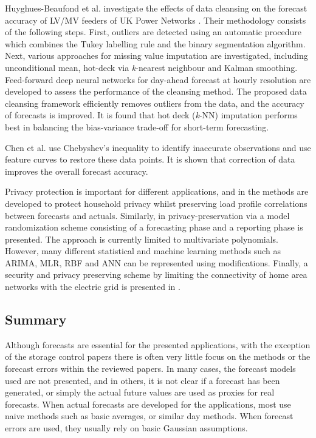 Huyghues-Beaufond et al. investigate the effects of data cleansing on the forecast accuracy of LV/MV feeders of UK Power Networks \cite{huyghues-beaufond2020raa}. Their methodology consists of the following steps. First, outliers are detected using an automatic procedure which combines the Tukey labelling rule \cite{Tukey} and the binary segmentation algorithm. Next, various approaches for missing value imputation are investigated, including unconditional mean, hot-deck via \textit{k}-nearest neighbour and Kalman smoothing. Feed-forward deep neural networks for day-ahead forecast at hourly resolution are developed to assess the performance of the cleansing method. 
The proposed data cleansing framework efficiently removes outliers from the data, and the accuracy of forecasts is improved. It is found that hot deck (\textit{k}-NN) imputation performs best in balancing the bias-variance trade-off for short-term forecasting.

Chen et al. \cite{chen2014ita}  use Chebyshev’s inequality to identify inaccurate observations and use feature curves to restore these data points. It is shown that correction of data improves the overall forecast accuracy. 

Privacy protection is important for different applications, and in \cite{boustani2017sgp} the methods are developed to protect household privacy whilst preserving load profile correlations between forecasts and actuals. 
Similarly, in  \cite{hou2020anp} privacy-preservation via a model randomization scheme 
consisting of a forecasting phase and a reporting phase is presented. The approach is currently limited to multivariate polynomials. However, many different statistical and machine learning methods such as ARIMA, MLR, RBF and ANN can be represented using modifications.
Finally,  a security and privacy preserving scheme by limiting the connectivity of home area networks with the electric grid is presented in \cite{abdallah2017lsa}. 


\subsection{Summary}
\label{sec:summary}

Although forecasts are essential for the presented applications, with the exception of the storage control papers there is often very little focus on the methods or the forecast errors within the reviewed papers. In many cases, the forecast models used are not presented, and in others, it is not clear if a forecast has been generated, or simply the actual future values are used as proxies for real forecasts. When actual forecasts are developed for the applications, most use naive methods such as basic averages, or similar day methods. When forecast errors are used, they usually rely on basic Gaussian assumptions.

